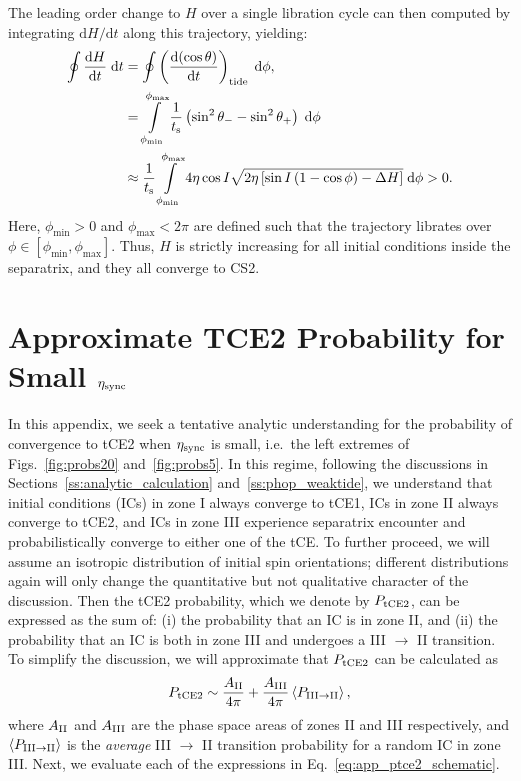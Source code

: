 \documentclass[
        fleqn,
        usenatbib,
        referee
    ]{mnras}
\newcommand*{\rd}[2]{\frac{\mathrm{d}#1}{\mathrm{d}#2}}
\newcommand*{\rdil}[2]{\mathrm{d}#1/\mathrm{d}#2}
\newcommand*{\ev}[1]{\left\langle#1\right\rangle}
\newcommand*{\p}[1]{\left(#1\right)}
\newcommand*{\s}[1]{\left[#1\right]}
\begin{document}
The leading order change to $H$ over a single libration cycle can then computed by
integrating $\rdil{H}{t}$ along this trajectory, yielding:
\begin{align}
    \oint \rd{H}{t}\;\mathrm{d}t
        &= \oint \p{\rd{(\cos \theta)}{t}}_{\rm tide}
            \;\mathrm{d}\phi,\nonumber\\
        &= \int\limits_{\phi_{\min}}^{\phi_{\max}}
                \frac{1}{t_{\rm s}}
                \p{\sin^2\theta_- - \sin^2\theta_+} \;\mathrm{d}\phi\nonumber\\
        &\approx \frac{1}{t_{\rm s}}
            \int\limits_{\phi_{\min}}^{\phi_{\max}}
                4\eta \cos I \sqrt{2\eta\s{\sin I\p{1 - \cos \phi} - \Delta H}}
                \;\mathrm{d}\phi > 0.
\end{align}
Here, $\phi_{\min} > 0$ and $\phi_{\max} < 2\pi$ are defined such that the
trajectory librates over $\phi \in \s{\phi_{\min}, \phi_{\max}}$. Thus, $H$ is
strictly increasing for all initial conditions inside the separatrix, and they
all converge to CS2.

\section{Approximate TCE2 Probability for Small $\eta_{\rm sync}$
}\label{app:ptce2}

In this appendix, we seek a tentative analytic understanding for the
probability of convergence to tCE2 when $\eta_{\rm sync}$ is small, i.e.\ the
left extremes of Figs.~\ref{fig:probs20} and~\ref{fig:probs5}. In this regime,
following the discussions in Sections~\ref{ss:analytic_calculation}
and~\ref{ss:phop_weaktide}, we understand that initial conditions (ICs) in zone I
always converge to tCE1, ICs in zone II always converge to tCE2,
and ICs in zone III experience separatrix encounter and
probabilistically converge to either one of the tCE\@. To further proceed, we
will assume an isotropic distribution of initial spin orientations; different
distributions again will only change the quantitative but not qualitative
character of the discussion. Then the tCE2 probability, which we denote by
$P_{\rm tCE2}$, can be expressed as the sum of: (i) the probability that an IC
is in zone II, and (ii) the probability that an IC is both in zone III and
undergoes a III $\to$ II transition. To simplify the discussion, we will
approximate that $P_{\rm tCE2}$ can be calculated as
\begin{equation}
    P_{\rm tCE2} \sim \frac{A_{\rm II}}{4\pi}
            + \frac{A_{\rm III}}{4\pi}\ev{P_{\rm III \to II}},
            \label{eq:app_ptce2_schematic}
\end{equation}
where $A_{\rm II}$ and $A_{\rm III}$ are the phase space areas of zones II and
III respectively, and $\ev{P_{\rm III \to II}}$ is the \emph{average} III $\to$
II transition probability for a random IC in zone III\@. Next, we evaluate each
of the expressions in Eq.~\eqref{eq:app_ptce2_schematic}.
\end{document}
